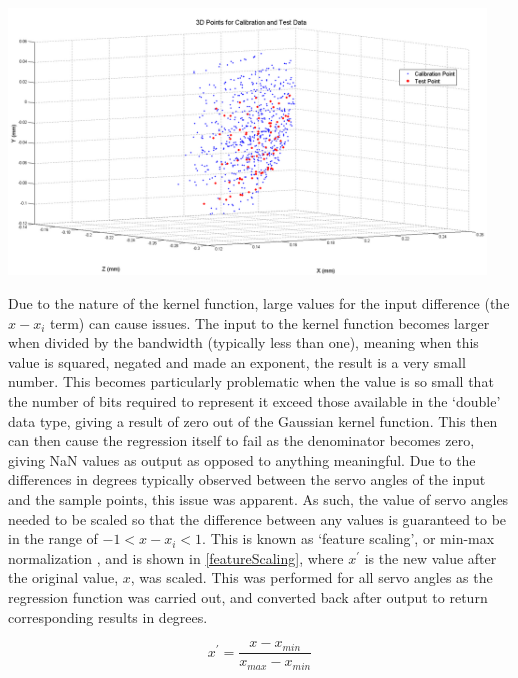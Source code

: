 \documentclass[11pt]{article}
\begin{document}
\begin{center}
\includegraphics[width=0.95\textwidth]{images/calibrationTestPoints.png}
\label{figure:calibrationTestPoints}
\end{center}



Due to the nature of the kernel function, large values for the input difference (the $x - x_{i}$ term) can cause issues. The input to the kernel function becomes larger when divided by the bandwidth (typically less than one), meaning when this value is squared, negated and made an exponent, the result is a very small number. This becomes particularly problematic when the value is so small that the number of bits required to represent it exceed those available in the `double' data type, giving a result of zero out of the Gaussian kernel function. This then can then cause the regression itself to fail as the denominator becomes zero, giving NaN values as output as opposed to anything meaningful. Due to the differences in degrees typically observed between the servo angles of the input and the sample points, this issue was apparent. As such, the value of servo angles needed to be scaled so that the difference between any values is guaranteed to be in the range of $-1 < x - x_{i} < 1$. This is known as `feature scaling', or min-max normalization \cite{mohamad2013}, and is shown in \eqref{featureScaling}, where $x^{\prime}$ is the new value after the original value, $x$, was scaled. This was performed for all servo angles as the regression function was carried out, and converted back after output to return corresponding results in degrees.

\begin{equation}\label{featureScaling}
x^{\prime} = \frac{x - x_{min}}{x_{max} - x_{min}}
\end{equation}
\end{document}
